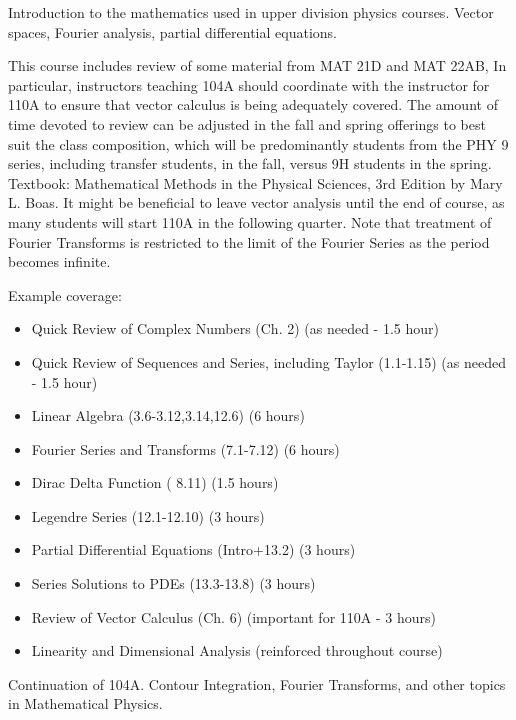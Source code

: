 \documentclass[12pt]{article}
\begin{document}
\vskip 1cm
Introduction to the mathematics used in upper division physics
courses. Vector spaces, Fourier analysis, partial differential
equations.

This course includes review of some material from MAT 21D and MAT
22AB, In particular, instructors teaching 104A should coordinate with
the instructor for 110A to ensure that vector calculus is being
adequately covered.  The amount of time devoted to review can be
adjusted in the fall and spring offerings to best suit the class
composition, which will be predominantly students from the PHY 9
series, including transfer students, in the fall, versus 9H students
in the spring.  Textbook: Mathematical Methods in the Physical
Sciences, 3rd Edition by Mary L. Boas.  It might be beneficial to
leave vector analysis until the end of course, as many students will
start 110A in the following quarter.  Note that treatment of Fourier
Transforms is restricted to the limit of the Fourier Series as the
period becomes infinite.

\begin{samepage}
Example coverage:
\begin{itemize}
\item Quick Review of Complex Numbers (Ch. 2) (as needed - 1.5 hour)
\item Quick Review of Sequences and Series, including Taylor (1.1-1.15) (as needed - 1.5 hour)
\item Linear Algebra (3.6-3.12,3.14,12.6) (6 hours)
\item Fourier Series and Transforms (7.1-7.12) (6 hours)
\item Dirac Delta Function ( 8.11) (1.5 hours)
\item Legendre Series (12.1-12.10) (3 hours)
\item Partial Differential Equations (Intro+13.2) (3 hours)
\item Series Solutions to PDEs (13.3-13.8) (3 hours)
\item Review of Vector Calculus (Ch. 6) (important for 110A - 3 hours)
\item Linearity and Dimensional Analysis (reinforced throughout course)
\end{itemize}
\end{samepage}

\vskip 1cm
Continuation of 104A.  Contour Integration, Fourier Transforms, and other topics in Mathematical Physics.
\end{document}

